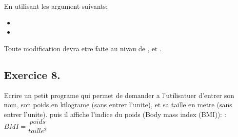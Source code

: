 \documentclass[letterpaper,10pt,french]{sphinxmanual}
\begin{document}
\begin{sphinxVerbatim}[commandchars=\\\{\}]
     
\end{sphinxVerbatim}

\sphinxAtStartPar
En utilisant les argument suivants:
\begin{itemize}
\item {} 
\sphinxAtStartPar
{}

\item {} 
\sphinxAtStartPar
{}

\end{itemize}

\sphinxAtStartPar
Toute modification devra etre faite au nivau de , et .

\begin{sphinxVerbatim}[commandchars=\\\{\}]
\end{sphinxVerbatim}




\subsection{Exercice 8.}
\label{\detokenize{exo5:exercice-8}}
\sphinxAtStartPar
Ecrire un petit programe qui permet de demander a l’utilisatuer d’entrer son nom, son poids en kilograme (sans entrer l’unite), et sa taille en metre (sans entrer l’unite). puis il affiche l’indice du poids (Body mass index (BMI)):
: \(BMI = \dfrac{poids}{taille^2}\)

\begin{sphinxVerbatim}[commandchars=\\\{\}]
\end{sphinxVerbatim}







\renewcommand{\indexname}{Index}
\printindex
\end{document}
